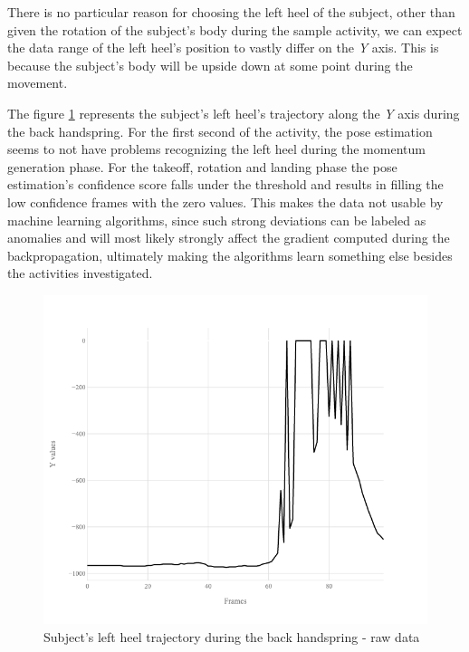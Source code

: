 There is no particular reason for choosing the left heel of the subject, other than given the rotation of the subject's body during the sample activity, we can expect the data range of the left heel's position to vastly differ on the \textit{Y} axis. This is because the subject's body will be upside down at some point during the movement.

The figure \ref{lack-17-rasmus-l-heel-y-raw} represents the subject's left heel's trajectory along the \textit{Y} axis during the back handspring. For the first second of the activity, the pose estimation seems to not have problems recognizing the left heel during the momentum generation phase. For the takeoff, rotation and landing phase the pose estimation's confidence score falls under the threshold and results in filling the low confidence frames with the zero values. This makes the data not usable by machine learning algorithms, since such strong deviations can be labeled as anomalies and will most likely strongly affect the gradient computed during the backpropagation, ultimately making the algorithms learn something else besides the activities investigated.

\begin{figure}[htb]
  \centering
    \includegraphics[width=\textwidth,keepaspectratio]
    {images/data-preprocessing/flack-17-rasmus-l-heel-y-raw}
    \caption{Subject's left heel trajectory during the back handspring - raw data}
    \label{lack-17-rasmus-l-heel-y-raw}
\end{figure}

